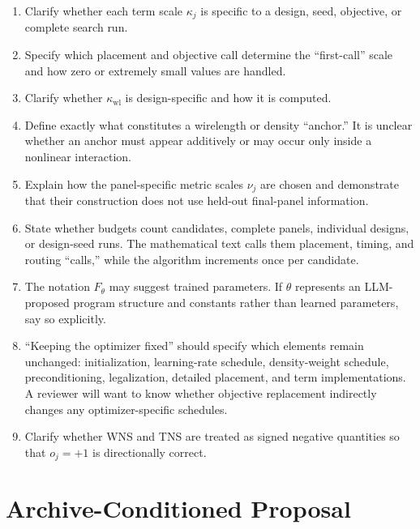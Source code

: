\documentclass[11pt]{article}
\begin{document}
\begin{enumerate}
  \item Clarify whether each term scale $\kappa_j$ is specific to a design,
  seed, objective, or complete search run.

  \item Specify which placement and objective call determine the ``first-call''
  scale and how zero or extremely small values are handled.

  \item Clarify whether $\kappa_{\mathrm{wl}}$ is design-specific and how it is
  computed.

  \item Define exactly what constitutes a wirelength or density ``anchor.'' It
  is unclear whether an anchor must appear additively or may occur only inside
  a nonlinear interaction.

  \item Explain how the panel-specific metric scales $\nu_j$ are chosen and
  demonstrate that their construction does not use held-out final-panel
  information.

  \item State whether budgets count candidates, complete panels, individual
  designs, or design-seed runs. The mathematical text calls them placement,
  timing, and routing ``calls,'' while the algorithm increments once per
  candidate.

  \item The notation $F_\theta$ may suggest trained parameters. If $\theta$
  represents an LLM-proposed program structure and constants rather than
  learned parameters, say so explicitly.

  \item ``Keeping the optimizer fixed'' should specify which elements remain
  unchanged: initialization, learning-rate schedule, density-weight schedule,
  preconditioning, legalization, detailed placement, and term
  implementations. A reviewer will want to know whether objective replacement
  indirectly changes any optimizer-specific schedules.

  \item Clarify whether WNS and TNS are treated as signed negative quantities
  so that $o_j=+1$ is directionally correct.
\end{enumerate}

\section{Archive-Conditioned Proposal}
\end{document}
